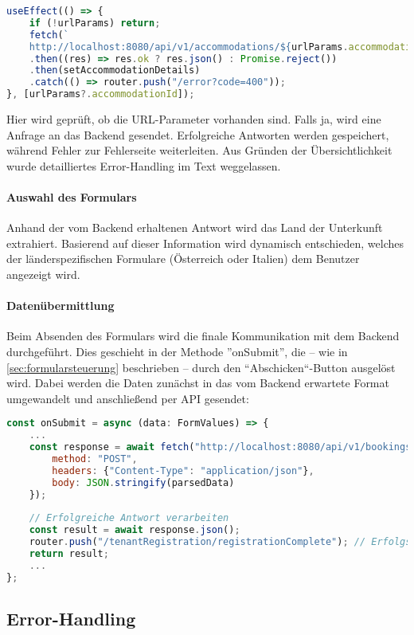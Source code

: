\begin{lstlisting}[language=JavaScript]
useEffect(() => {
    if (!urlParams) return;
    fetch(`
    http://localhost:8080/api/v1/accommodations/${urlParams.accommodationId}`)
    .then((res) => res.ok ? res.json() : Promise.reject())
    .then(setAccommodationDetails)
    .catch(() => router.push("/error?code=400"));
}, [urlParams?.accommodationId]);
\end{lstlisting}

Hier wird geprüft, ob die URL-Parameter vorhanden sind. Falls ja, wird eine Anfrage an das Backend gesendet. Erfolgreiche Antworten werden gespeichert, während Fehler zur Fehlerseite weiterleiten. Aus Gründen der Übersichtlichkeit wurde detailliertes Error-Handling im Text weggelassen.

\paragraph{Auswahl des Formulars}
Anhand der vom Backend erhaltenen Antwort wird das Land der Unterkunft extrahiert. Basierend auf dieser Information wird dynamisch entschieden, welches der länderspezifischen Formulare (Österreich oder Italien) dem Benutzer angezeigt wird.

\paragraph{Datenübermittlung}
Beim Absenden des Formulars wird die finale Kommunikation mit dem Backend durchgeführt. Dies geschieht in der Methode ''onSubmit'', die – wie in \ref{sec:formularsteuerung} beschrieben – durch den ``Abschicken``-Button ausgelöst wird. Dabei werden die Daten zunächst in das vom Backend erwartete Format umgewandelt und anschließend per API gesendet:

\begin{lstlisting}[language=JavaScript]
const onSubmit = async (data: FormValues) => {
    ...
    const response = await fetch("http://localhost:8080/api/v1/bookings", {
        method: "POST",
        headers: {"Content-Type": "application/json"},
        body: JSON.stringify(parsedData)
    });
    
    // Erfolgreiche Antwort verarbeiten
    const result = await response.json();
    router.push("/tenantRegistration/registrationComplete"); // Erfolgsseite anzeigen
    return result;
    ...
};
\end{lstlisting}

\subsection{Error-Handling}
\label{sec:errorHandling}

